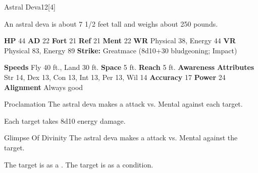       
  \begin{monsubsection}{Astral Deva}{12}[4]
    \vspace{-1em}\vspace{-1em}
    \vspace{0em}

    
          An astral deva is about 7 1/2 feet tall and weighs about 250 pounds.
        

    \begin{spellcontent}
      \begin{spelltargetinginfo}
        \pari \textbf{HP} 44 \monsep
          \textbf{AD} 22 \monsep
          \textbf{Fort} 21 \monsep
          \textbf{Ref} 21 \monsep
          \textbf{Ment} 22
        \pari \textbf{WR} Physical 38, Energy 44 \monsep
        \textbf{VR} Physical 83, Energy 89
        \pari \textbf{Strike:}
            Greatmace  (8d10+30 bludgeoning; Impact)
      \end{spelltargetinginfo}
    \end{spellcontent}
    \begin{monsterfooter}
      \pari \textbf{Speeds} Fly 40 ft., Land 30 ft. \monsep
        \textbf{Space} 5 ft. \monsep
        \textbf{Reach} 5 ft.
      \pari \textbf{Awareness} 
      \pari \textbf{Attributes}
        Str 14, Dex 13,
        Con 13, Int 13,
        Per 13, Wil 14
      \pari \textbf{Accuracy} 17 \monsep
        \textbf{Power} 24
      \pari \textbf{Alignment} Always good
    \end{monsterfooter}
  \end{monsubsection}
  \begin{freeability}{Proclamation}
       The astral deva makes a  attack
        vs. Mental against each target.
    
    \hit Each target takes 8d10 energy damage.
    \end{freeability}
  

    \begin{freeability}{Glimpse Of Divinity}
       The astral deva makes a  attack
        vs. Mental against the target.
    
    \hit The target is  as a .
    \crit The target is  as a condition.
    \end{freeability}
  

